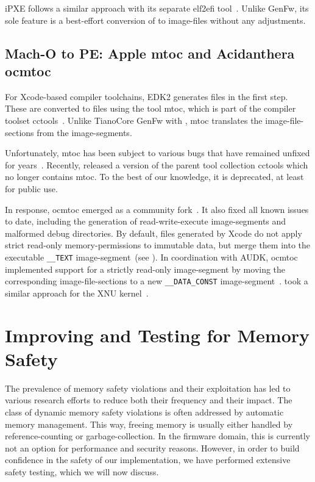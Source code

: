 iPXE follows a similar approach with its separate elf2efi tool~\cite{ipxe}. Unlike GenFw, its sole feature is a best-effort conversion of  to   \glspl{image-file} without any adjustments.

\subsection{Mach-O to PE: Apple mtoc and Acidanthera ocmtoc}

For Xcode-based compiler toolchains, \gls{EDK2} generates  files in the first step. These are converted to  files using the  tool mtoc, which is part of the  compiler toolset cctools~\cite{apple-cctools}. Unlike TianoCore GenFw with , mtoc translates the  \glspl{image-file-section} from the  \glspl{image-segment}.

Unfortunately, mtoc has been subject to various bugs that have remained unfixed for years~\cite{ocmtoc}. Recently,  released a version of the parent tool collection cctools which no longer contains mtoc. To the best of our knowledge, it is deprecated, at least for public use.

In response, ocmtoc emerged as a community fork~\cite{ocmtoc}. It also fixed all known issues to date, including the generation of read-write-execute \glspl{image-segment} and malformed debug directories. By default,  files generated by Xcode do not apply strict read-only \gls{memory-permissions} to immutable data, but merge them into the executable \texttt{\_\_TEXT} \gls{image-segment}~(see ). In coordination with \gls{AUDK}, ocmtoc implemented support for a strictly read-only \gls{image-segment} by moving the corresponding \glspl{image-file-section} to a new \texttt{\_\_DATA\_CONST} \gls{image-segment}~\cite{audk,ocmtoc}.  took a similar approach for the XNU kernel~\cite{xnu}.

\section{Improving and Testing for Memory Safety}
\label{sec:impr_mem_safety}

The prevalence of memory safety violations and their exploitation has led to various research efforts to reduce both their frequency and their impact. The class of dynamic memory safety violations is often addressed by automatic memory management. This way, freeing memory is usually either handled by \gls{reference-counting} or \gls{garbage-collection}. In the \gls{firmware} domain, this is currently not an option for performance and security reasons. However, in order to build confidence in the safety of our implementation, we have performed extensive safety testing, which we will now discuss.

